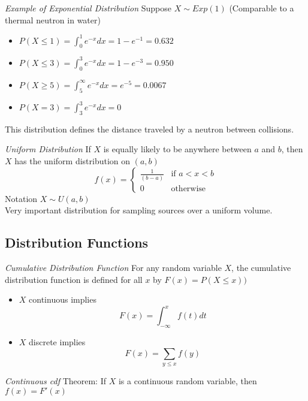 \emph{Example of Exponential Distribution}
  Suppose $X \sim Exp(1)$ (Comparable to a thermal neutron in water)
  \begin{itemize}
    \item $P(X\le1)=\int_{0}^{1}e^{-x}dx=1-e^{-1} = 0.632$
    \item $P(X\le3)=\int_{0}^{3}e^{-x}dx=1-e^{-3} = 0.950$
    \item $P(X\ge5)=\int_{5}^{\infty}e^{-x}dx=e^{-5}=0.0067$
    \item $P(X=3)=\int_{3}^{3}e^{-x}dx=0$
  \end{itemize}
 This distribution defines the distance traveled by a neutron between collisions.


\emph{Uniform Distribution}
  If $X$ is equally likely to be anywhere between $a$ and $b$, then $X$ has the uniform distribution on $(a,b)$
     \begin{displaymath}
        f(x) = \left\{ \begin{array}{ll}
                         \frac{1}{(b-a)} & \textrm{if $a < x < b$}\\                       
                         0 & \textrm{otherwise}
                       \end{array} \right.
     \end{displaymath}
  Notation $X \sim U(a,b)$\\
  Very important distribution for sampling sources over a uniform volume.


\subsection{Distribution Functions}

\emph{Cumulative Distribution Function}
  For any random variable $X$, the cumulative distribution function is defined for all $x$ by $F(x) = P(X\le x))$
  \begin{itemize}
    \item $X$ continuous implies
      \begin{equation*}
          F(x) = \int_{-\infty}^{x}f(t)dt
      \end{equation*}
    \item $X$ discrete implies
      \begin{equation*}
          F(x) = \sum_{y\le x}f(y)
      \end{equation*}
  \end{itemize}


\emph{Continuous cdf}
  Theorem: If $X$ is a continuous random variable, then $f(x) = F'(x)$



